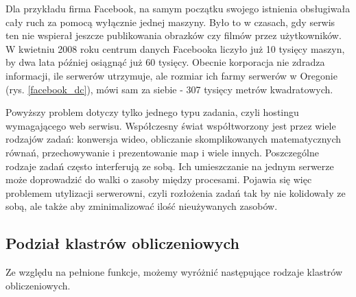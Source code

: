 \documentclass[10pt,a4paper,titlepage,twoside]{report}
\begin{document}
Dla przykładu firma Facebook, na samym początku swojego istnienia obsługiwała cały ruch za pomocą wyłącznie jednej maszyny\cite{ad4}. Było to w czasach, gdy serwis ten nie wspierał jeszcze publikowania obrazków czy filmów przez użytkowników. W kwietniu 2008 roku centrum danych Facebooka liczyło już 10 tysięcy maszyn, by dwa lata później osiągnąć już 60 tysięcy. Obecnie korporacja nie zdradza informacji, ile serwerów utrzymuje, ale rozmiar ich farmy serwerów w Oregonie (rys. \ref{facebook_dc}), mówi sam za siebie - 307 tysięcy metrów kwadratowych\cite{ad5}.

Powyższy problem dotyczy tylko jednego typu zadania, czyli hostingu wymagającego web serwisu. Współczesny świat współtworzony jest przez wiele rodzajów zadań: konwersja wideo, obliczanie skomplikowanych matematycznych równań, przechowywanie i prezentowanie map i wiele innych. Poszczególne rodzaje zadań często interferują ze sobą. Ich umieszczanie na jednym serwerze może doprowadzić do walki o zasoby między procesami. Pojawia się więc problemem utylizacji serwerowni, czyli rozłożenia zadań tak by nie kolidowały ze sobą, ale także aby zminimalizować ilość nieużywanych zasobów\cite{ad5}.

\subsection{Podział klastrów obliczeniowych}\indent \indent Ze względu na pełnione funkcje, możemy wyróżnić następujące rodzaje klastrów obliczeniowych\cite{ad6}.
\end{document}
